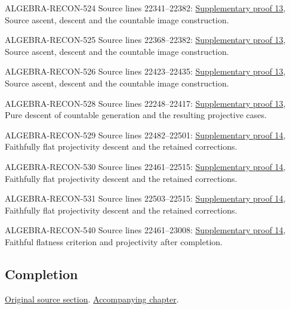 \begin{AlgebraSourceRoutes}
\item[ALGEBRA-RECON-524] Source lines 22341--22382: \hyperlink{algebra_ml_coherent_notes_20260927}{Supplementary proof 13}, Source ascent, descent and the countable image construction.
\item[ALGEBRA-RECON-525] Source lines 22368--22382: \hyperlink{algebra_ml_coherent_notes_20260927}{Supplementary proof 13}, Source ascent, descent and the countable image construction.
\item[ALGEBRA-RECON-526] Source lines 22423--22435: \hyperlink{algebra_ml_coherent_notes_20260927}{Supplementary proof 13}, Source ascent, descent and the countable image construction.
\item[ALGEBRA-RECON-528] Source lines 22248--22417: \hyperlink{algebra_ml_coherent_notes_20260927}{Supplementary proof 13}, Pure descent of countable generation and the resulting projective cases.
\item[ALGEBRA-RECON-529] Source lines 22482--22501: \hyperlink{algebra_projectivity_completion_notes_20260927}{Supplementary proof 14}, Faithfully flat projectivity descent and the retained corrections.
\item[ALGEBRA-RECON-530] Source lines 22461--22515: \hyperlink{algebra_projectivity_completion_notes_20260927}{Supplementary proof 14}, Faithfully flat projectivity descent and the retained corrections.
\item[ALGEBRA-RECON-531] Source lines 22503--22515: \hyperlink{algebra_projectivity_completion_notes_20260927}{Supplementary proof 14}, Faithfully flat projectivity descent and the retained corrections.
\item[ALGEBRA-RECON-540] Source lines 22461--23008: \hyperlink{algebra_projectivity_completion_notes_20260927}{Supplementary proof 14}, Faithful flatness criterion and projectivity after completion.
\end{AlgebraSourceRoutes}

\subsection{Completion}
\hypertarget{algebra-source-section-completion}{}
\noindent\href{https://github.com/stacks/stacks-project/blob/a04446e57ec1fbc252a871afcec7752fb2807b14/algebra.tex\#L22528}{Original source section}. \href{algebra.pdf\#nameddest=section-completion}{Accompanying chapter}.


